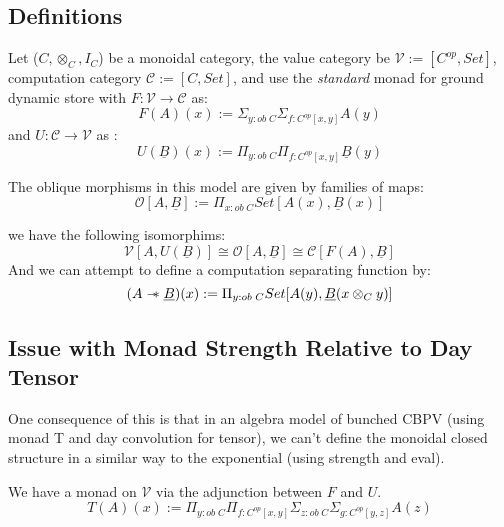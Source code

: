 \documentclass{article}
\newcommand{\sep}{\mathrel{-\mkern-6mu*}}
\begin{document}
\subsection{Definitions}
Let ($C, \otimes_C , I_C$) be a monoidal category, the value category be $\mathcal{V} := [C^{op} , Set]$, 
computation category $\mathcal{C} := [C , Set]$, and use the \textit{standard}
monad for ground dynamic store with $F : \mathcal{V} \rightarrow \mathcal{C}$ as:
\[
    F(A)(x) := \Sigma_{y : ob \;C}\Sigma_{f : C^{op}[ x , y ]}A(y)    
\]
and $U : \mathcal{C} \rightarrow \mathcal{V}$ as :
\[
    U(\underline{B})(x) := \Pi_{y : ob \; C}\Pi_{f : C^{op}[ x , y]}\underline{B}(y)   
\]

The oblique morphisms in this model are given by families of maps:
\[
    \mathcal{O}[A , \underline{B}] := \Pi_{x : ob \; C} Set[A(x) , \underline{B}(x)]   
\]

we have the following isomorphims:
\[
    \mathcal{V}[A , U(\underline{B})] \cong \mathcal{O}[A , \underline{B}] \cong \mathcal{C}[F(A) , \underline{B}]   
\]
And we can attempt to define a computation separating function by:
\[
    (A \sep \underline{B})(x) := \Pi_{y : ob \;C} Set[A(y), \underline{B}(x \otimes_C y)]
\]

\subsection{Issue with Monad Strength Relative to Day Tensor}
One consequence of this is that in an algebra model of bunched CBPV (using monad T and day convolution for tensor), 
we can't define the monoidal closed structure in a similar way to the exponential (using strength and eval).

We have a monad on $\mathcal{V}$ via the adjunction between $F$ and $U$.
\[
    T(A)(x) := \Pi_{y : ob \; C}\Pi_{f : C^{op}[ x , y]}\Sigma_{z : ob \;C}\Sigma_{g : C^{op}[ y , z ]}A(z) 
\]
\end{document}
